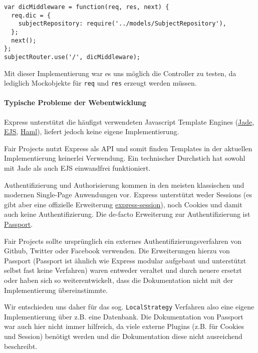 \documentclass[]{article}
\begin{document}
\begin{verbatim}
var dicMiddleware = function(req, res, next) {
  req.dic = {
    subjectRepository: require('../models/SubjectRepository'),
  };
  next();
};
subjectRouter.use('/', dicMiddleware);
\end{verbatim}

Mit dieser Implementierung war es uns möglich die Controller zu testen,
da lediglich Mockobjekte für \texttt{req} und \texttt{res} erzeugt
werden müssen.

\paragraph{Typische Probleme der
Webentwicklung}\label{typische-probleme-der-webentwicklung}

Express unterstützt die häufigst verwendeten Javascript Template Engines
(\href{http://github.com/visionmedia/jade}{Jade},
\href{http://github.com/visionmedia/ejs}{EJS},
\href{http://github.com/visionmedia/haml.js}{Haml}), liefert jedoch
keine eigene Implementierung.

Fair Projects nutzt Express als API und somit finden Templates in der
aktuellen Implementierung keinerlei Verwendung. Ein technischer
Durchstich hat sowohl mit Jade als auch EJS einwandfrei funktioniert.

Authentifizierung und Authorisierung kommen in den meisten klassischen
und modernen Single-Page Anwendungen vor. Express unterstützt weder
Sessions (es gibt aber eine offizielle Erweiterung
\href{https://github.com/expressjs/session}{express-session}), noch
Cookies und damit auch keine Authentifizierung. Die de-facto Erweiterung
zur Authentifizierung ist \href{http://passportjs.org/}{Passport}.

Fair Projects sollte ursprünglich ein externes
Authentifizierungsverfahren von Github, Twitter oder Facebook verwenden.
Die Erweiterungen hierzu von Passport (Passport ist ähnlich wie Express
modular aufgebaut und unterstützt selbst fast keine Verfahren) waren
entweder veraltet und durch neuere ersetzt oder haben sich so
weiterentwickelt, dass die Dokumentation nicht mit der Implementierung
übereinstimmte.

Wir entschieden uns daher für das sog. \texttt{LocalStrategy} Verfahren
also eine eigene Implementierung über z.B. eine Datenbank. Die
Dokumentation von Passport war auch hier nicht immer hilfreich, da viele
externe Plugins (z.B. für Cookies und Session) benötigt werden und die
Dokumentation diese nicht ausreichend beschreibt.
\end{document}
